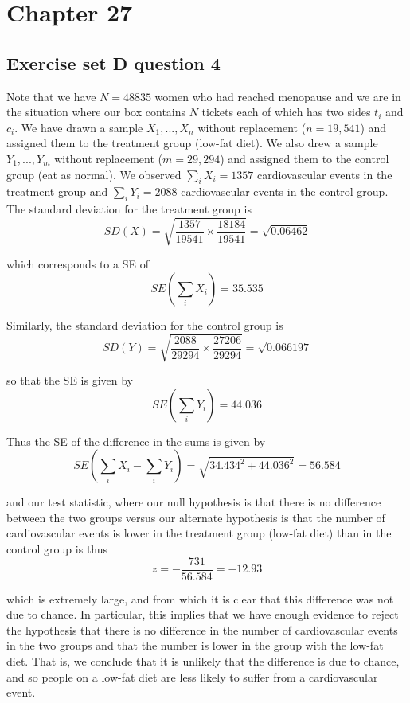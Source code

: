 \documentclass[11pt]{article}
\begin{document}
\section*{Chapter 27}
\subsection*{Exercise set D question 4} %

\noindent Note that we have $N = 48835$ women who had reached menopause and we are in the situation where our box contains $N$ tickets each of which has two sides $t_i$ and $c_i$. We have drawn a sample $X_1, ..., X_n$ without replacement ($n = 19,541$) and assigned them to the treatment group (low-fat diet). We also drew a sample $Y_1, ..., Y_m$ without replacement ($m = 29,294$) and assigned them to the control group (eat as normal). We observed $\sum_i X_i = 1357$ cardiovascular events in the treatment group and $\sum_i Y_i = 2088$ cardiovascular events in the control group. The standard deviation for the treatment group is
$$SD(X) = \sqrt{\frac{1357}{19541} \times \frac{18184}{19541}} = \sqrt{0.06462}$$

\noindent which corresponds to a SE of
$$SE\left(\sum_i X_i\right) = 35.535$$

\noindent Similarly, the standard deviation for the control group is
$$SD(Y) = \sqrt{\frac{2088}{29294} \times \frac{27206}{29294}} = \sqrt{0.066197}$$

\noindent so that the SE is given by
$$SE\left(\sum_i Y_i\right) = 44.036$$

\noindent Thus the SE of the difference in the sums is given by
$$SE\left( \sum_i X_i - \sum_i Y_i\right) = \sqrt{34.434^2 + 44.036^2} = 56.584$$


\noindent and our test statistic, where our null hypothesis is that there is no difference between the two groups versus our alternate hypothesis is that the number of cardiovascular events is lower in the treatment group (low-fat diet) than in the control group is thus
$$z = -\frac{731}{56.584} = -12.93$$

\noindent which is extremely large, and from which it is clear that this difference was not due to chance. In particular, this implies that we have enough evidence to reject the hypothesis that there is no difference in the number of cardiovascular events in the two groups and that the number is lower in the group with the low-fat diet. That is, we conclude that it is unlikely that the difference is due to chance, and so people on a low-fat diet are less likely to suffer from a cardiovascular event.
\end{document}
